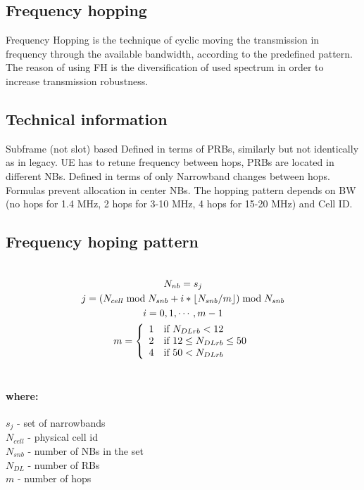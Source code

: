\documentclass[12pt]{article}
\DeclarePairedDelimiter\floor{\lfloor}{\rfloor}
\begin{document}
\subsection{Frequency hopping}
Frequency Hopping is the technique of cyclic moving the transmission in frequency through the available bandwidth, according to the predefined pattern. The reason of using FH is the diversification of used spectrum in order to increase transmission robustness.

\subsection{Technical information}
Subframe (not slot) based
Defined in terms of PRBs, similarly but not identically as in legacy.
UE has to retune frequency between hops, PRBs are located in different NBs.
Defined in terms of only Narrowband changes between hops.
Formulas prevent allocation in center NBs.
The hopping pattern depends on BW (no hops for 1.4 MHz, 2 hops for 3-10 MHz, 4 hops for 15-20 MHz) and Cell ID.



\subsection{Frequency hoping pattern}
\begin{align*}
\begin{multlined} \\
N_{nb}=s_j  \\
j=(N_{cell}\bmod N_{s nb}+i*\floor*{N_{snb}/m})\bmod N_{snb} \\
i=0,1,\cdots,m-1 \\
m = \left\{
\begin{array}{ll}
1 & \mbox{if } N_{DLrb} < 12 \\
2 & \mbox{if } 12 \leq N_{DLrb} \leq 50 \\
4 & \mbox{if } 50 < N_{DLrb} \\
\end{array}\right.  \\ 
\end{multlined}
\end{align*}

\paragraph{where:\\}
$s_j$ - set of narrowbands \\
$N_{cell}$ - physical cell id \\
$N_{snb}$ - number of NBs in the set \\
$N_{DL}$ - number of RBs \\
$m$ - number of hops \\
\end{document}
